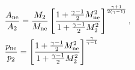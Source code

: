 \documentclass[10pt]{article}
\begin{document}
\begin{align*}& \frac{A_{\rm ne}}{A_{2}}
=
\frac{M_{2}}{M_{\rm ne}} 
\left[ 
\frac{ 1+\frac{\gamma-1}{2} M_{\rm ne}^{2}}{1+\frac{\gamma-1}{2} M_{2}^{2}}
\right]^{\frac{\gamma+1}{2 \left( \gamma - 1 \right)}} , 
\\
& \frac{p_{\rm ne}}{p_{2}}
=
\left[ 
\frac{1+\frac{\gamma-1}{2} M_{\rm ne}^{2}}{1+\frac{\gamma-1}{2} M_{2}^{2}}
\right]^{\frac{\gamma}{\gamma - 1 } }
\end{align*}
\end{document}
